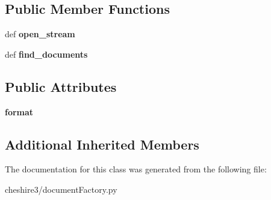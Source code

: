 \subsection*{Public Member Functions}
\begin{DoxyCompactItemize}
\item 
\hypertarget{classcheshire3_1_1document_factory_1_1_tar_document_stream_a1eec32f137b0fc3cc7f7bfb512267648}{def {\bfseries open\-\_\-stream}}\label{classcheshire3_1_1document_factory_1_1_tar_document_stream_a1eec32f137b0fc3cc7f7bfb512267648}

\item 
\hypertarget{classcheshire3_1_1document_factory_1_1_tar_document_stream_aaa273ea3357e6de3a716d15c54e2a0c8}{def {\bfseries find\-\_\-documents}}\label{classcheshire3_1_1document_factory_1_1_tar_document_stream_aaa273ea3357e6de3a716d15c54e2a0c8}

\end{DoxyCompactItemize}
\subsection*{Public Attributes}
\begin{DoxyCompactItemize}
\item 
\hypertarget{classcheshire3_1_1document_factory_1_1_tar_document_stream_acb8bc30f65b109b9ef5d604bb0702905}{{\bfseries format}}\label{classcheshire3_1_1document_factory_1_1_tar_document_stream_acb8bc30f65b109b9ef5d604bb0702905}

\end{DoxyCompactItemize}
\subsection*{Additional Inherited Members}


The documentation for this class was generated from the following file\-:\begin{DoxyCompactItemize}
\item 
cheshire3/document\-Factory.\-py\end{DoxyCompactItemize}

